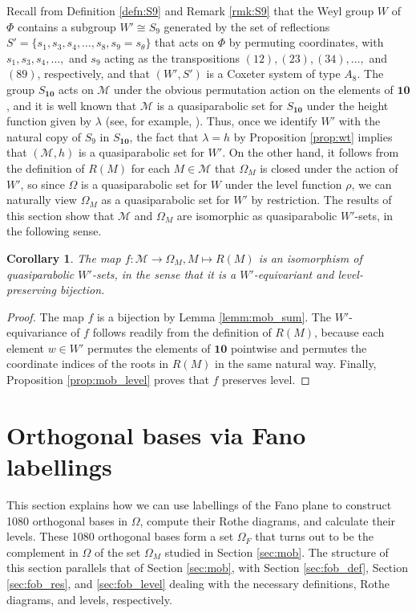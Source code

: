 \documentclass[10pt,a4paper]{amsart}
\newtheorem{cor}[theorem]{Corollary}
\numberwithin{equation}{section}
\newcommand{\ra}{\rightarrow}
\newcommand{\calm}{\mathcal{M}}
\newcommand{\ten}{\mathbf{10}}
\newcommand{\ob}{\Omega}
\newcommand{\fob}{\Omega_F}
\newcommand{\mob}{\Omega_M}
\begin{document}
Recall from Definition \ref{defn:S9} and Remark \ref{rmk:S9} that the Weyl group
$W$ of $\Phi$ contains a subgroup $W'\cong S_9$ generated by the set of
reflections $S'=\{s_1, s_3, s_4, \dots, s_8, s_9=s_\theta\}$ that acts on
$\Phi$ by permuting coordinates, with $s_1, s_3, s_4, \dots,$ and $s_9$ acting
as the transpositions $(12), (23), (34), \dots,$ and $(89)$, respectively,  and
that $(W',S')$ is a Coxeter system of type $A_8$. The group $S_\ten$ acts on
$\calm$ under the obvious permutation action on the elements of $\ten$, and it
is well known that $\calm$ is a quasiparabolic set for $S_\ten$ under the height
function given by $\lambda$ (see, for example, \cite[Theorem 4.6]{rains13}).
Thus, once we identify $W'$ with the natural copy of $S_9$ in $S_\ten$, the fact
that $\lambda=h$ by Proposition \ref{prop:wt} implies that $(\calm,h)$ is a
quasiparabolic set for $W'$. On the other hand, it follows from the definition
of $R(M)$ for each $M\in \calm$ that $\mob$ is closed under the action of $W'$,
so since $\ob$ is a quasiparabolic set for $W$ under the level function $\rho$,
we can naturally view $\mob$ as a quasiparabolic set for $W'$ by restriction.
The results of this section show that $\calm$ and $\mob$ are isomorphic as
quasiparabolic $W'$-sets, in the following sense.

\begin{cor}
\label{cor:matching_iso}
The map $f: \calm\ra \mob, M\mapsto R(M)$ is an isomorphism of quasiparabolic
$W'$-sets, in the sense that it is a $W'$-equivariant and level-preserving 
bijection.
\end{cor}

\begin{proof}
The map $f$ is a bijection by Lemma \ref{lemm:mob_sum}. The $W'$-equivariance of
$f$ follows readily from the definition of $R(M)$,  because each element $w\in
W'$ permutes the elements of $\ten$ pointwise and permutes the coordinate indices of
the roots in $R(M)$ in the same natural way. Finally, Proposition
\ref{prop:mob_level} proves that $f$ preserves level. 
\end{proof}

\section{Orthogonal bases via Fano labellings}
\label{sec:fob}
This section explains how we can use labellings of the Fano plane to construct
1080 orthogonal bases in $\ob$, compute their Rothe diagrams, and calculate
their levels. These 1080 orthogonal bases form a set $\fob$ that turns out to
be the complement in $\ob$ of the set $\Omega_M$ studied in Section \ref{sec:mob}. The structure
of this section parallels that of Section \ref{sec:mob}, with Section
\ref{sec:fob_def}, Section \ref{sec:fob_res}, and \ref{sec:fob_level} dealing
with the necessary definitions, Rothe diagrams, and levels, respectively. 
\end{document}
